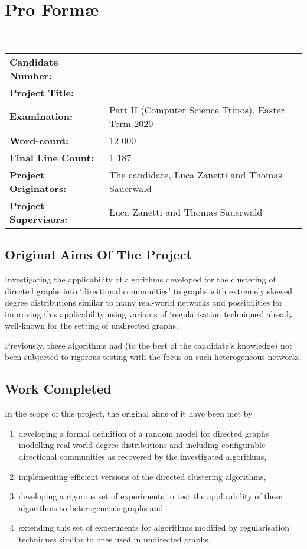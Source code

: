 \section*{Pro Form{\ae}}
\ \\
\noindent
\begin{tabular}{@{}p{}p{}}
\bfseries Candidate Number:      & \ \\[5pt]
\bfseries Project Title:         & \title \\[5pt]
\bfseries Examination: 	       & Part II (Computer Science Tripos), Easter Term 2020\\[5pt]
\bfseries Word-count:            & 12 000\footnotemark \\[5pt]
\bfseries Final Line Count:      & 1 187\footnotemark\\[5pt]
\bfseries Project Originators:   & The candidate, Luca Zanetti and Thomas Sauerwald \\[5pt]
\bfseries Project Supervisors:   & Luca Zanetti and Thomas Sauerwald 
\end{tabular}
\addtocounter{footnote}{-1}
\addtocounter{footnote}{1}

\subsection*{Original Aims Of The Project}
Investigating the applicability of algorithms developed for the clustering of directed graphs into 
`directional communities' to graphs with extremely skewed degree distributions similar to many 
real-world networks and possibilities for improving this applicability using variants of 
`regularisation techniques' already well-known for the setting of undirected graphs.

Previously, these algorithms had (to the best of the candidate's knowledge) not been subjected to 
rigorous testing with the focus on such heterogeneous networks.

\subsection*{Work Completed}
In the scope of this project, the original aims of it have been met by 
\begin{enumerate}[(1)]
\item developing a formal definition of a random model for directed graphs modelling real-world degree distributions and including configurable directional communities as recovered by the investigated algorithms,
\item implementing efficient versions of the directed clustering algorithms,
\item developing a rigorous set of experiments to test the applicability of these algorithms to heterogeneous graphs and
\item extending this set of experiments for algorithms modified by regularisation techniques similar to ones used in undirected graphs.
\end{enumerate}

